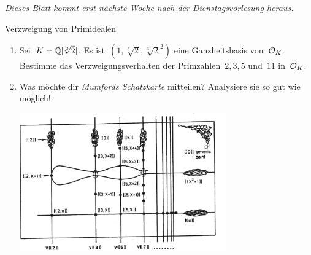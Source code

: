 \documentclass[entwurf]{uebblatt}
\begin{document}

\begin{center}
  \emph{Dieses Blatt kommt erst nächste Woche nach der Dienstagsvorlesung heraus.}
\end{center}

\begin{aufgabe}{Verzweigung von Primidealen}
\begin{enumerate}
\item Sei~$K = \mathbb{Q}[\sqrt[3]{2}]$. Es ist~$(1,\sqrt[3]{2},\sqrt[3]{2}^2)$ eine
Ganzheitsbasis von~$\mathcal{O}_K$. Bestimme das Verzweigungsverhalten der
Primzahlen~$2, 3, 5$ und~$11$ in~$\mathcal{O}_K$.
\item Was möchte dir \emph{Mumfords Schatzkarte} mitteilen? Analysiere sie so
gut wie möglich!

\centering\includegraphics[width=0.7\textwidth]{images/mumfords-treasure-map}
\end{enumerate}
\end{aufgabe}
\end{document}
